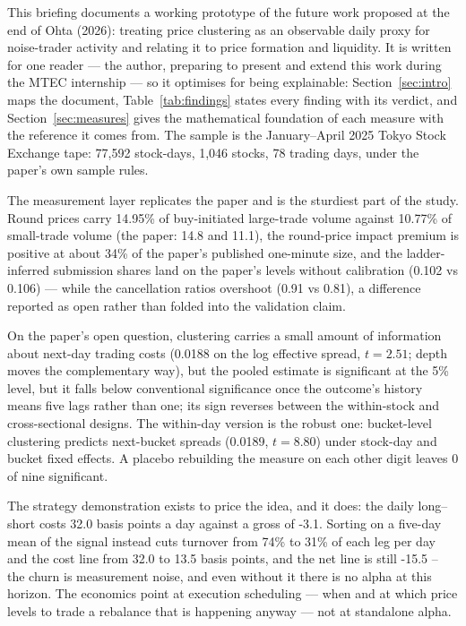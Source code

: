 
This briefing documents a working prototype of the future work proposed at the
end of Ohta (2026): treating price clustering as an observable daily proxy for
noise-trader activity and relating it to price formation and liquidity. It is
written for one reader --- the author, preparing to present and extend this
work during the MTEC internship --- so it optimises for being explainable:
Section~\ref{sec:intro} maps the document, Table~\ref{tab:findings}
states every finding with its verdict, and Section~\ref{sec:measures} gives
the mathematical foundation of each measure with the reference it comes from.
The sample is the January--April 2025 Tokyo Stock Exchange tape: 77,592 stock-days,
1,046 stocks, 78 trading days, under the paper's own sample
rules.

The measurement layer replicates the paper and is the sturdiest part of the
study. Round prices carry 14.95\% of buy-initiated large-trade volume
against 10.77\% of small-trade volume (the paper: 14.8 and 11.1), the
round-price impact premium is positive at about 34\% of
the paper's published one-minute size, and the ladder-inferred submission
shares land on the paper's levels without calibration (0.102 vs
0.106) --- while the cancellation ratios overshoot (0.91 vs 0.81),
a difference reported as open rather than folded into the validation claim.

On the paper's open question, clustering carries a small amount of information about next-day trading costs (0.0188 on the log effective spread, $t=2.51$; depth moves the complementary way), but the pooled estimate is significant at the 5\% level, but it falls below conventional significance once the outcome's history means five lags rather than one; its sign reverses between the within-stock and cross-sectional designs. The within-day version is the
robust one: bucket-level clustering predicts next-bucket spreads
(0.0189, $t=8.80$) under stock-day and bucket fixed effects. A
placebo rebuilding the measure on each other digit leaves 0 of nine
significant.

The strategy demonstration exists to price the idea, and it does: the daily
long--short costs 32.0 basis points a day
against a gross of -3.1. Sorting on a five-day mean of the signal instead cuts turnover from 74\% to 31\% of each leg per day and the cost line from 32.0 to 13.5 basis points, and the net line is still -15.5 -- the churn is measurement noise, and even without it there is no alpha at this horizon.
The economics point at execution scheduling --- when and at which price levels
to trade a rebalance that is happening anyway --- not at standalone alpha.

